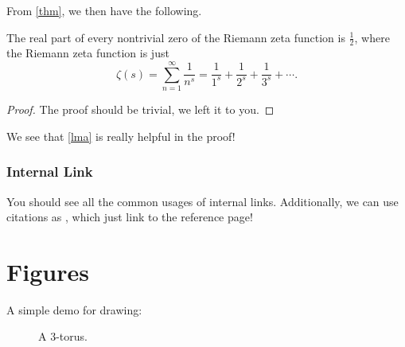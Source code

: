 From \autoref{thm}, we then have the following.
\begin{corollary}\label{col}
	The real part of every nontrivial zero of the Riemann zeta function is \(\frac{1}{2}\), where the Riemann zeta function is just
	\[
		\zeta (s)=\sum _{n=1}^{\infty }{\frac {1}{n^{s}}}={\frac {1}{1^{s}}}+{\frac {1}{2^{s}}}+{\frac {1}{3^{s}}}+\cdots.
	\]
\end{corollary}
\begin{proof}
	The proof should be trivial, we left it to you.
\end{proof}
\begin{prev}
	We see that \autoref{lma} is really helpful in the proof!
\end{prev}

\subsubsection{Internal Link}
You should see all the common usages of internal links. Additionally, we can use citations as \cite{newton1726philosophiae}, which just link to the reference page!

\section{Figures}
A simple demo for drawing:
\begin{figure}[H]
	\centering
	\caption[Caption]{A \(3\)-torus.\footnotemark}
	\label{fig:test}
\end{figure}

